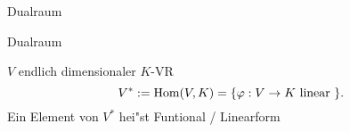\documentclass[class=article, crop=false]{standalone}
\begin{document}
\begin{zettel}{Dualraum}
\begin{flashcard}[5ka74ejj]{Dualraum}
	\begin{definition}
		$V$ endlich dimensionaler $K$-VR
		\[
			V^\ast := \Hom(V, K) = \set{\varphi : V \to  K \tx{linear} }
		.\]
		Ein Element von $V^\ast $ hei"st Funtional / Linearform
	\end{definition}
\end{flashcard}
\end{zettel}
\end{document}
